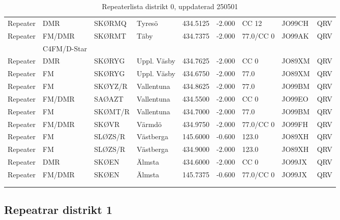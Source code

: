 \begin{longtable}{llllrrlll}
Repeater & DMR         & SKØRMQ   & Tyresö      & 434.5125     & -2.000     & CC 12      & JO99CH      & QRV      \\
Repeater & FM/DMR      & SKØRMT   & Täby        & 434.7375     & -2.000     & 77.0/CC 0  & JO99AK      & QRV      \\
         & C4FM/D-Star &          &             &              &            &            &             &          \\
Repeater & DMR         & SKØRYG   & Uppl. Väsby & 434.7625     & -2.000     & CC 0       & JO89XM      & QRV      \\
Repeater & FM          & SKØRYG   & Uppl. Väsby & 434.6750     & -2.000     & 77.0       & JO89XM      & QRV      \\
Repeater & FM          & SKØYZ/R  & Vallentuna  & 434.8625     & -2.000     & 77.0       & JO99BM      & QRV      \\
Repeater & FM/DMR      & SAØAZT   & Vallentuna  & 434.5500     & -2.000     & CC 0       & JO99EO      & QRV      \\
Repeater & FM          & SKØMT/R  & Vallentuna  & 434.7000     & -2.000     & 77.0       & JO99BM      & QRV      \\
Repeater & FM/DMR      & SKØVR    & Värmdö      & 434.9750     & -2.000     & 77.0/CC 0  & JO99FH      & QRV      \\
Repeater & FM          & SLØZS/R  & Västberga   & 145.6000     & -0.600     & 123.0      & JO89XH      & QRV      \\
Repeater & FM          & SLØZS/R  & Västberga   & 434.9000     & -2.000     & 123.0      & JO89XH      & QRV      \\
Repeater & DMR         & SKØEN    & Älmsta      & 434.6000     & -2.000     & CC 0       & JO99JX      & QRV      \\
Repeater & FM/DMR      & SKØEN    & Älmsta      & 145.7375     & -0.600     & 77.0/CC 0  & JO99JX      & QRV      \\
\vspace{1 ex}                                                                                                     \\
\caption{Repeaterlista distrikt 0, uppdaterad 250501}
\end{longtable}

\subsection{Repeatrar distrikt 1}

